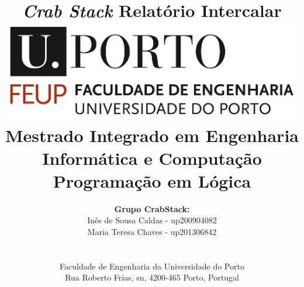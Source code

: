\documentclass[a4paper]{article}
\begin{document}
\setlength{\textwidth}{16cm}
\setlength{\textheight}{22cm}

\title{\Huge\textbf{\textit{Crab Stack}}\linebreak\linebreak\linebreak
\Large\textbf{Relatório Intercalar}\linebreak\linebreak
\linebreak\linebreak
\includegraphics[scale=0.1]{feup-logo.png}\linebreak\linebreak
\linebreak\linebreak
\Large{Mestrado Integrado em Engenharia Informática e Computação} \linebreak\linebreak
\Large{Programação em Lógica}\linebreak
}

\author{\textbf{Grupo Crab\textunderscore Stack:}\\
Inês de Sousa Caldas - up200904082 \\
Maria Teresa Chaves - up201306842 \\
\linebreak\linebreak \\
 \\ Faculdade de Engenharia da Universidade do Porto \\ Rua Roberto Frias, s\/n, 4200-465 Porto, Portugal \linebreak\linebreak\linebreak
\linebreak\linebreak\vspace{1cm}}

\maketitle
\thispagestyle{empty}
\end{document}
